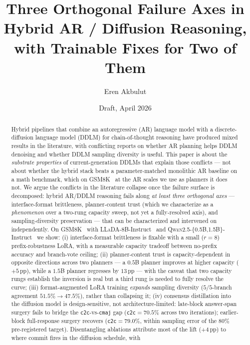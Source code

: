 \documentclass[11pt]{article}
\title{Three Orthogonal Failure Axes in Hybrid AR / Diffusion Reasoning,\\
       with Trainable Fixes for Two of Them}
\author{Eren Akbulut}
\date{Draft, April 2026}
\newcommand{\code}[1]{\texttt{#1}}
\newcommand{\LLaDA}{\textsc{LLaDA}}
\newcommand{\Qwen}[1]{\textsc{Qwen2.5-#1}}
\newcommand{\ctwoc}{\code{c2c}}
\newcommand{\cmaj}{\code{cmaj}}
\begin{document}
\maketitle

\begin{abstract}
Hybrid pipelines that combine an autoregressive (AR) language model
with a discrete-diffusion language model (DDLM) for chain-of-thought
reasoning have produced mixed results in the literature, with
conflicting reports on whether AR planning helps DDLM denoising and
whether DDLM sampling diversity is useful.  This paper is about
the \emph{substrate properties} of current-generation DDLMs that
explain those conflicts --- not about whether the hybrid stack
beats a parameter-matched monolithic AR baseline on a math
benchmark, which on GSM8K~\citep{cobbe2021gsm8k} at the AR scales
we use as planners it does not.  We argue the conflicts in the
literature collapse once the failure surface is decomposed: hybrid
AR/DDLM reasoning fails along \emph{at least three orthogonal axes} ---
interface-format brittleness, planner-content trust (which we
characterize as a \emph{phenomenon} over a two-rung capacity
sweep, not yet a fully-resolved axis), and sampling-diversity
preservation --- that can be characterized and intervened on
independently.  On GSM8K~\citep{cobbe2021gsm8k} with
\LLaDA{}-8B-Instruct~\citep{nie2025llada} and
\Qwen{\{0.5B,1.5B\}}-Instruct~\citep{qwen2024report} we show: (i)
interface-format brittleness is fixable with a small
($r{=}8$)~\citep{hu2022lora} prefix-robustness LoRA, with a
measurable capacity tradeoff between no-prefix accuracy and
branch-vote ceiling; (ii) planner-content trust is
capacity-dependent in opposite directions across two planners ---
a $0.5$B planner improves at higher capacity ($+5$\,pp), while a
$1.5$B planner regresses by $13$\,pp --- with the caveat that two
capacity rungs establish the inversion is real but a third rung is
needed to fully resolve the curve; (iii)
format-augmented LoRA training \emph{expands} sampling diversity
($5/5$-branch agreement $51.5\% \rightarrow 47.5\%$), rather than
collapsing it; (iv) consensus distillation into the diffusion model
is design-sensitive, not architecture-limited: late-block answer-span
surgery fails to bridge the \ctwoc{}-vs-\cmaj{} gap (\ctwoc{}$=70.5\%$
across two iterations); earlier-block full-response surgery recovers
(\ctwoc{}$=79.0\%$, within sampling error of the $80\%$ pre-registered
target).  Disentangling ablations attribute most of the lift
($+4$\,pp) to where commit fires in the diffusion schedule, with

\end{abstract}
\end{document}

